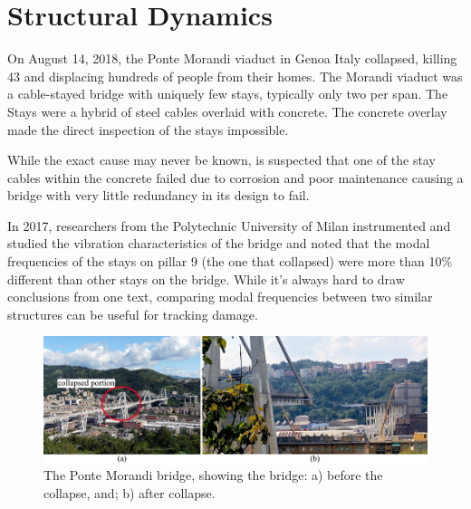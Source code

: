 \documentclass[12pt,letter]{article}
\numberwithin{ex}{section} %
\numberwithin{re}{section} %
\newtheorem{vcs}{Vibration Case Study}
\numberwithin{vcs}{section} %
\newenvironment{vibration_case_study}{\begin{mdframed}[linecolor=orange,middlelinewidth=2mm,roundcorner=20pt]\begin{vcs}\normalfont}{\end{vcs}\end{mdframed}}
\begin{document}
	
	\setcounter{section}{6}	
	\setcounter{figure}{0}   
	\renewcommand\thefigure{\thesection.\arabic{figure}}
	\setcounter{equation}{0}   
	\renewcommand\theequation{\thesection.\arabic{equation}}	
	
	\section{Structural Dynamics}	


\begin{vibration_case_study}

	On August 14, 2018, the Ponte Morandi viaduct in Genoa Italy collapsed, killing 43 and displacing hundreds of people from their homes. The Morandi viaduct was a cable-stayed bridge with uniquely few stays, typically only two per span. The Stays were a hybrid of steel cables overlaid with concrete. The concrete overlay made the direct inspection of the stays impossible. 
	
	While the exact cause may never be known, is suspected that one of the stay cables within the concrete failed due to corrosion and poor maintenance causing a bridge with very little redundancy in its design to fail\protect\footnotemark[1].
	
	In 2017, researchers from the Polytechnic University of Milan instrumented and studied the vibration characteristics of the bridge and noted that the modal frequencies of the stays on pillar 9 (the one that collapsed) were more than 10\% different than other stays on the bridge. While it's always hard to draw conclusions from one text, comparing modal frequencies between two similar structures can be useful for tracking damage. 
 
	\begin{figure}[H]
		\centering
		\includegraphics[width=6in]{../figures/ponte_morandi_bridge}
		\caption{The Ponte Morandi bridge, showing the bridge: a) before the collapse\protect\footnotemark[2], and; b) after collapse\protect\footnotemark[3]. }
	\end{figure}
		
\end{vibration_case_study}
	
\end{document}
